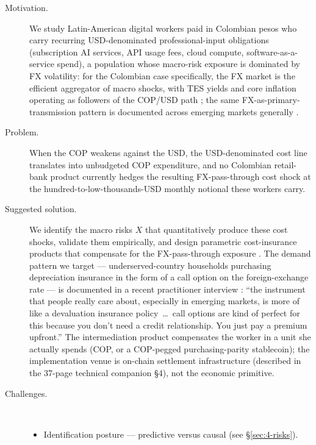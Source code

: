 \begin{description}
  \item[Motivation.] We study Latin-American digital workers paid in Colombian pesos who carry recurring USD-denominated professional-input obligations (subscription AI services, API usage fees, cloud compute, software-as-a-service spend), a population whose macro-risk exposure is dominated by FX volatility: for the Colombian case specifically, the FX market is the efficient aggregator of macro shocks, with TES yields and core inflation operating as followers of the COP/USD path \citep{rincontorresInterdependenceFXTreasury2021,rincontorresLowFrequencyEffectMacroNews2023,rinconcastroTraspasoTasaCambio2021,fuentesIntradayExchangeRate2014}; the same FX-as-primary-transmission pattern is documented across emerging markets generally \citep{calvo_reinhart_2002,rey_2015,bruno_shin_2015}.
  \item[Problem.] When the COP weakens against the USD, the USD-denominated cost line translates into unbudgeted COP expenditure, and no Colombian retail-bank product currently hedges the resulting FX-pass-through cost shock at the hundred-to-low-thousands-USD monthly notional these workers carry.
  \item[Suggested solution.] We identify the macro risks \(X\) that quantitatively produce these cost shocks, validate them empirically, and design parametric cost-insurance products that compensate for the FX-pass-through exposure \citep{carter_etal_2017,mahul_stutley_2010,clarke_2016}. The demand pattern we target --- underserved-country households purchasing depreciation insurance in the form of a call option on the foreign-exchange rate --- is documented in a recent practitioner interview \citep{depreciation_insurance_talk}: ``the instrument that people really care about, especially in emerging markets, is more of like a devaluation insurance policy~\ldots~call options are kind of perfect for this because you don't need a credit relationship. You just pay a premium upfront.'' The intermediation product compensates the worker in a unit she actually spends (COP, or a COP-pegged purchasing-parity stablecoin); the implementation venue is on-chain settlement infrastructure (described in the 37-page technical companion \S4), not the economic primitive.
  \item[Challenges.]\hfill\\
  \begin{itemize}
    \item Identification posture --- predictive versus causal (see \S\ref{sec:4-risks}).

\end{itemize}
\end{description}
